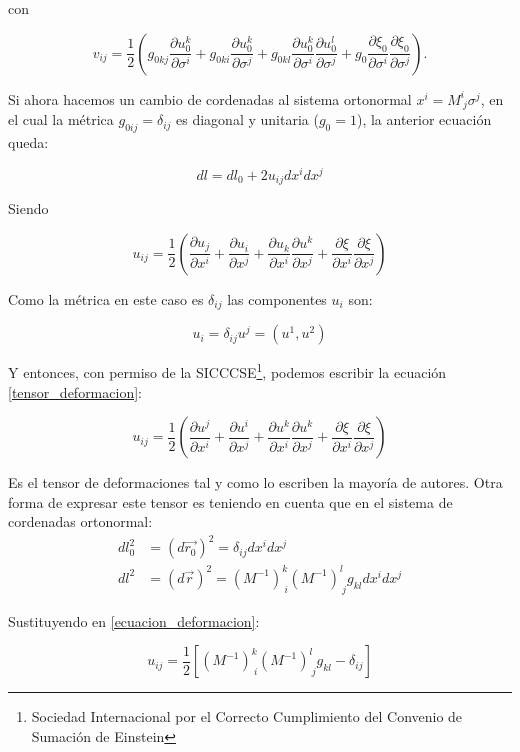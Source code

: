 con

\begin{equation*}
v_{ij}=\frac{1}{2}\left(
 g_{0kj}\frac{\partial u^k_0}{\partial \sigma^i}+
  g_{0ki}\frac{\partial u^k_0}{\partial \sigma^j}+
g_{0kl}\frac{\partial u^k_0}{\partial\sigma^i}
\frac{\partial u^l_0}{\partial \sigma^j}+
g_0\frac{\partial \xi_0}{\partial \sigma^i}\frac{\partial \xi_0}{\partial \sigma^j}\right).
\end{equation*}

Si ahora hacemos un cambio de cordenadas al sistema ortonormal $x^i=M^i_{\
  j}\sigma^j$, en el cual la métrica $g_{0ij}=\delta_{ij}$ es diagonal y
unitaria ($g_0=1$), la anterior ecuación queda: 

\begin{equation}\label{ecuacion_deformacion}
dl=dl_0+2u_{ij}dx^idx^j
\end{equation}

Siendo

\begin{equation}\label{tensor_deformacion}
u_{ij}=\frac{1}{2}\left(
\frac{\partial u_j}{\partial x^i}+
\frac{\partial u_i}{\partial x^j}+
\frac{\partial u_k}{\partial x^i}
\frac{\partial u^k}{\partial x^j}+
\frac{\partial \xi}{\partial x^i}
\frac{\partial \xi}{\partial x^j}\right)
\end{equation} 

Como la métrica en este caso es $\delta_{ij}$ las componentes $u_i$ son:

\begin{equation*}
u_i=\delta_{ij} u^j=(u^1,u^2)
\end{equation*}

Y entonces, con permiso de la SICCCSE\footnote{Sociedad Internacional por el Correcto
  Cumplimiento del Convenio de Sumación de Einstein}, podemos escribir la
ecuación \eqref{tensor_deformacion}:

\begin{equation*}
u_{ij}=\frac{1}{2}\left(
\frac{\partial u^j}{\partial x^i}+
\frac{\partial u^i}{\partial x^j}+
\frac{\partial u^k}{\partial x^i}
\frac{\partial u^k}{\partial x^j}+
\frac{\partial \xi}{\partial x^i}
\frac{\partial \xi}{\partial x^j}\right)
\end{equation*} 

Es el tensor de deformaciones tal y como lo escriben la mayoría de
autores. Otra forma de expresar este tensor es teniendo en cuenta que en el
sistema de cordenadas ortonormal:
\begin{align*}
dl^2_0&=(d\vec{r_0})^2=\delta_{ij}dx^idx^j\\
dl^2&=(d\vec{r})^2=(M^{-1})^k_{\ i}(M^{-1})^l_{\ j}g_{kl}dx^idx^j\label{dl0}
\end{align*}


Sustituyendo en \eqref{ecuacion_deformacion}:

\begin{equation*}
u_{ij}=\frac{1}{2}\left[(M^{-1})^{k}_{\ i}(M^{-1})^l_{\ j}g_{kl}-\delta_{ij}\right]
\end{equation*}

